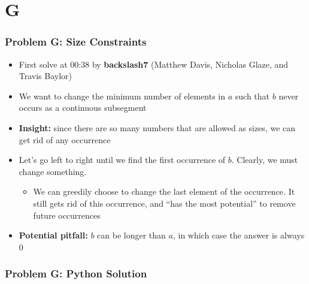 \section{G}%
\label{sec:g}

\begin{frame}
  \frametitle{Problem G: Size Constraints}

  \begin{itemize}
    \item First solve at 00:38 by \textbf{backslash7} (Matthew Davis, Nicholas Glaze, and Travis Baylor)
    \item We want to change the minimum number of elements in $a$ such that $b$ never occurs as a continuous subsegment
    \item \textbf{Insight:} since there are so many numbers that are allowed as sizes, we can get rid of any occurrence
    \item Let's go left to right until we find the first occurrence of $b$. Clearly, we must change something.
      \begin{itemize}
        \item We can greedily choose to change the last element of the occurrence. It still gets rid of this occurrence, and ``has the most potential''
          to remove future occurrences
      \end{itemize}
    \item \textbf{Potential pitfall:} $b$ can be longer than $a$, in which case the answer is always 0
  \end{itemize}
\end{frame}

\begin{frame}
  \frametitle{Problem G: Python Solution}
\end{frame}
